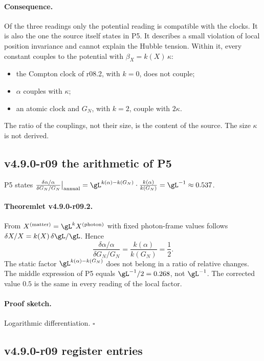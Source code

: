 \paragraph{Consequence.}
Of the three readings only the potential reading is compatible with the clocks.  It is also the one the source itself
states in P5.  It describes a small violation of local position invariance and cannot explain the Hubble tension.
Within it, every constant couples to the potential with \(\beta_X=k(X)\,\kappa\):
\begin{itemize}[leftmargin=2em]
\item the Compton clock of r08.2, with \(k=0\), does not couple;
\item \(\alpha\) couples with \(\kappa\);
\item an atomic clock and \(G_N\), with \(k=2\), couple with \(2\kappa\).
\end{itemize}
The ratio of the couplings, not their size, is the content of the source.  The size \(\kappa\) is not derived.

\subsection*{v4.9.0-r09 the arithmetic of P5}
\label{subsec:v490-r09-p5}

P5 states
\(\frac{\delta\alpha/\alpha}{\delta G_N/G_N}\big|_{\rm annual}=\gL^{k(\alpha)-k(G_N)}\cdot\frac{k(\alpha)}{k(G_N)}=\gL^{-1}\approx
0.537\).

\paragraph{Theoremlet v4.9.0-r09.2.}
From \(X^{(\mathrm{matter})}=\gL^{k}X^{(\mathrm{photon})}\) with fixed photon-frame values follows
\(\delta X/X=k(X)\,\delta\gL/\gL\).  Hence
\[
\frac{\delta\alpha/\alpha}{\delta G_N/G_N}=\frac{k(\alpha)}{k(G_N)}=\frac12 .
\]
The static factor \(\gL^{k(\alpha)-k(G_N)}\) does not belong in a ratio of relative changes.  The middle expression of P5
equals \(\gL^{-1}/2=0.268\), not \(\gL^{-1}\).  The corrected value \(0.5\) is the same in every reading of the local factor.

\paragraph{Proof sketch.}
Logarithmic differentiation.  \(\square\)

\subsection*{v4.9.0-r09 register entries}
\label{subsec:v490-r09-register}

